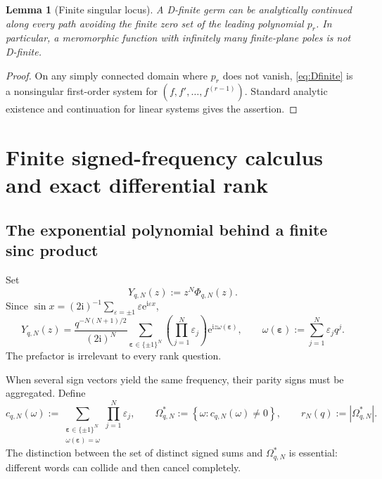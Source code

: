 \documentclass[11pt]{article}
\numberwithin{equation}{section}
\newtheorem{lemma}[theorem]{Lemma}
\theoremstyle{definition}
\theoremstyle{remark}
\newcommand{\ii}{\mathrm i}
\newcommand{\e}{\mathrm e}
\newcommand{\eps}{\varepsilon}
\newcommand{\abs}[1]{\left\lvert#1\right\rvert}
\newcommand{\set}[1]{\left\{#1\right\}}
\begin{document}
\begin{lemma}[Finite singular locus]
\label{lem:finite-singular-locus}
A D-finite germ can be analytically continued along every path avoiding the
finite zero set of the leading polynomial $p_r$.  In particular, a meromorphic
function with infinitely many finite-plane poles is not D-finite.
\end{lemma}
\begin{proof}
On any simply connected domain where $p_r$ does not vanish,
\eqref{eq:Dfinite} is a nonsingular first-order system for
$(f,f',\ldots,f^{(r-1)})$.  Standard analytic existence and continuation for
linear systems gives the assertion.
\end{proof}

\section{Finite signed-frequency calculus and exact differential rank}
\label{sec:finite-rank}

\subsection{The exponential polynomial behind a finite sinc product}

Set
\begin{equation}
 Y_{q,N}(z):=z^N\Phi_{q,N}(z).
 \label{eq:gauged-product}
\end{equation}
Since
$\sin x=(2\ii)^{-1}\sum_{\eps=\pm1}\eps\e^{\ii\eps x}$,
\begin{equation}
 Y_{q,N}(z)=\frac{q^{-N(N+1)/2}}{(2\ii)^N}
 \sum_{\bm\eps\in\{\pm1\}^N}
 \left(\prod_{j=1}^{N}\eps_j\right)
 \e^{\ii z\omega(\bm\eps)},
 \qquad
 \omega(\bm\eps):=\sum_{j=1}^{N}\eps_jq^j.
 \label{eq:frequency-expansion}
\end{equation}
The prefactor is irrelevant to every rank question.

When several sign vectors yield the same frequency, their parity signs must be
aggregated.  Define
\begin{equation}
 c_{q,N}(\omega):=
 \sum_{\substack{\bm\eps\in\{\pm1\}^N\\
                   \omega(\bm\eps)=\omega}}
 \prod_{j=1}^{N}\eps_j,
 \qquad
 \Omega^*_{q,N}:=\set{\omega:c_{q,N}(\omega)\ne0},
 \qquad r_N(q):=\abs{\Omega^*_{q,N}}.
 \label{eq:aggregated-support}
\end{equation}
The distinction between the set of distinct signed sums and $\Omega^*_{q,N}$
is essential: different words can collide and then cancel completely.
\end{document}
